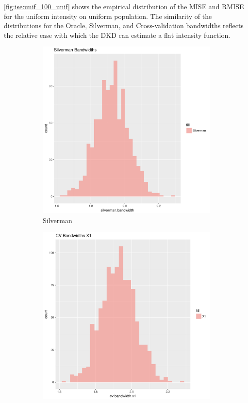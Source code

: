 \autoref{fig:ise:unif_100_unif} shows the empirical distribution of the MISE and RMISE for the uniform intensity on uniform population.
The similarity of the distributions for the Oracle, Silverman, and Cross-validation bandwidths
reflects the relative ease with which the DKD can estimate a flat intensity function.

\begin{figure}[htbp]
    \centering
    \begin{subfigure}[b]{0.3\textwidth}
    \includegraphics[width=\textwidth]{results/unif_100_unif/output/bandwidths-silverman}
    \caption{Silverman}
    \label{fig:bandwidths_x1:unif_100_unif:s}
    \end{subfigure}
    \begin{subfigure}[b]{0.3\textwidth}
    \includegraphics[width=\textwidth]{results/unif_100_unif/output/bandwidths-x1}

\end{subfigure}
\end{figure}
